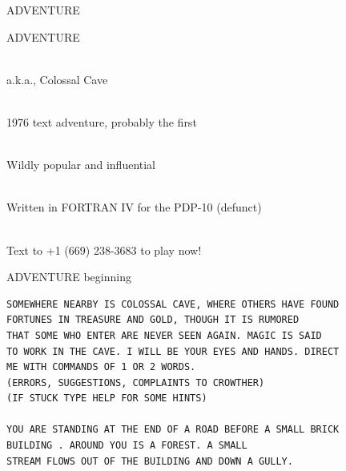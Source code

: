 \documentclass{beamer}
\begin{document}
\begin{frame}{ADVENTURE}

ADVENTURE

\ \\

a.k.a., Colossal Cave

\ \\

1976 text adventure, probably the first

\ \\

Wildly popular and influential

\ \\

Written in FORTRAN IV for the PDP-10 (defunct)

\ \\

Text to +1 (669) 238-3683 to play now!

\end{frame}

\begin{frame}[fragile]{ADVENTURE beginning}

\begin{verbatim}
SOMEWHERE NEARBY IS COLOSSAL CAVE, WHERE OTHERS HAVE FOUND
FORTUNES IN TREASURE AND GOLD, THOUGH IT IS RUMORED
THAT SOME WHO ENTER ARE NEVER SEEN AGAIN. MAGIC IS SAID
TO WORK IN THE CAVE. I WILL BE YOUR EYES AND HANDS. DIRECT
ME WITH COMMANDS OF 1 OR 2 WORDS.
(ERRORS, SUGGESTIONS, COMPLAINTS TO CROWTHER)
(IF STUCK TYPE HELP FOR SOME HINTS)

YOU ARE STANDING AT THE END OF A ROAD BEFORE A SMALL BRICK
BUILDING . AROUND YOU IS A FOREST. A SMALL
STREAM FLOWS OUT OF THE BUILDING AND DOWN A GULLY.
\end{verbatim}

\end{frame}
\end{document}
